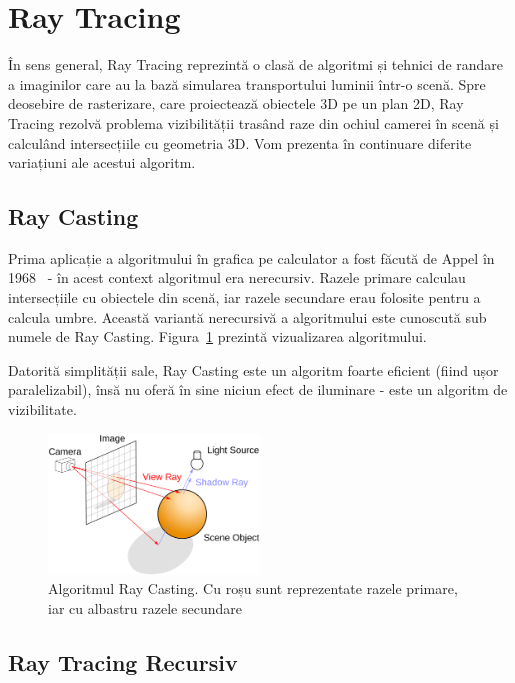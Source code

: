 \documentclass[12pt,a4paper]{report}
\numberwithin{equation}{section} %
\begin{document}
\section{Ray Tracing}

În sens general, Ray Tracing reprezintă o clasă de algoritmi și tehnici de randare
a imaginilor care au la bază simularea transportului luminii într-o scenă.
Spre deosebire de rasterizare, care proiectează obiectele 3D pe un plan 2D, Ray
Tracing rezolvă problema vizibilității trasând raze din ochiul camerei în scenă
și calculând intersecțiile cu geometria 3D. Vom prezenta în continuare diferite
variațiuni ale acestui algoritm.

\subsection*{Ray Casting}

Prima aplicație a algoritmului în
grafica pe calculator a fost făcută de Appel în 1968~\cite{Appel} - în acest
context algoritmul era nerecursiv. Razele primare calculau intersecțiile cu obiectele
din scenă, iar razele secundare erau folosite pentru a calcula umbre. Această
variantă nerecursivă a algoritmului este cunoscută sub numele de Ray Casting.
Figura~\ref{fig:raycasting} prezintă vizualizarea algoritmului.

Datorită simplității sale, Ray Casting este un algoritm foarte eficient (fiind ușor
paralelizabil), însă nu oferă în sine niciun efect de iluminare - este un algoritm
de vizibilitate.

\begin{figure}[ht]
	\centering
	\includegraphics[width=0.5\textwidth]{pics/appel.png}
	\caption{Algoritmul Ray Casting. Cu roșu sunt reprezentate razele primare, iar cu albastru razele secundare\protect\footnotemark}
	\label{fig:raycasting}
\end{figure}

\subsection*{Ray Tracing Recursiv}
\end{document}

